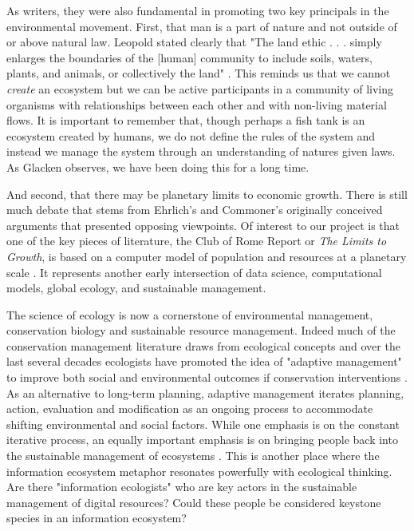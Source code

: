  As writers, they were also fundamental in promoting two key principals in the environmental movement. First, that man is a part of nature and not outside of or above natural law. Leopold stated clearly that "The land ethic . . . simply enlarges the boundaries of the [human] community to include soils, waters, plants, and animals, or collectively the land" \citep[][p. 204]{leopold_1949}. This reminds us that we cannot \textit{create} an ecosystem but we can be active participants in a community of living organisms with relationships between each other and with non-living material flows. It is important to remember that, though perhaps a fish tank is an ecosystem created by humans, we do not define the rules of the system and instead we manage the system through an understanding of natures given laws. As Glacken observes, we have been doing this for a long time.

 And second, that there may be planetary limits to economic growth. There is still much debate that stems from Ehrlich's and Commoner's originally conceived arguments that presented opposing viewpoints. Of interest to our project is that one of the key pieces of literature, the Club of Rome Report or \textit{The Limits to Growth}, is based on a computer model of population and resources at a planetary scale \citep{meadows_1972}. It represents another early intersection of data science, computational models, global ecology, and sustainable management.
 
 The science of ecology is now a cornerstone of environmental management, conservation biology and sustainable resource management. Indeed much of the conservation management literature draws from ecological concepts and over the last several decades ecologists have promoted the idea of "adaptive management" to improve both social and environmental outcomes if conservation interventions \citep{holling_1978,leopold_1963}. As an alternative to long-term planning, adaptive management iterates planning, action, evaluation and modification as an ongoing process to accommodate shifting environmental and social factors. While one emphasis is on the constant iterative process, an equally important emphasis is on bringing people back into the sustainable management of ecosystems \citep{berkes_2000,holling_2002}. This is another place where the information ecosystem metaphor resonates powerfully with ecological thinking. Are there "information ecologists" who are key actors in the sustainable management of digital resources? Could these people be considered keystone species in an information ecosystem?